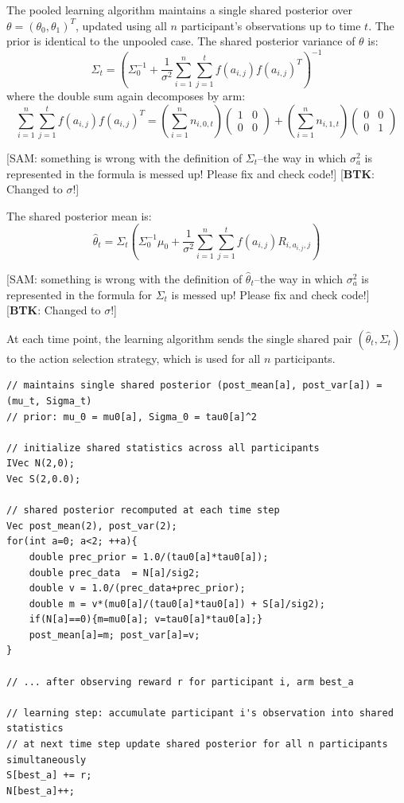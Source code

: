 \documentclass[letterpaper, 9pt]{extarticle}
\newcommand{\sam}[1]{
  {\color{blue} [SAM: {#1}]}
 }
\newcommand{\btk}[1]{%
  {\color{red} [\textbf{BTK}: {#1}]}%
}
\begin{document}
The pooled learning algorithm maintains a single shared posterior over $\theta=(\theta_0,\theta_1)^T$, updated using all $n$ participant's observations up to time $t$. The prior is identical to the unpooled case. The shared posterior variance of $\theta$ is:
\[
\Sigma_t = \left(\Sigma_0^{-1} + \frac{1}{\sigma^2} \sum_{i=1}^n \sum_{j=1}^t f(a_{i,j})f(a_{i,j})^T \right)^{-1}
\]
where the double sum again decomposes by arm:
\[
\sum_{i=1}^n \sum_{j=1}^t f(a_{i,j})f(a_{i,j})^T = \left(\sum_{i=1}^n n_{i,0,t} \right) \begin{pmatrix}
    1 & 0 \\ 0 & 0
\end{pmatrix} + \left(\sum_{i=1}^n n_{i,1,t} \right) \begin{pmatrix}
    0 & 0 \\ 0 & 1
\end{pmatrix}
\]
\sam{something is wrong with the definition of $\Sigma_{t}$--the way in which $\sigma_a^2$ is represented in the formula is messed up! Please fix and check code!} \btk{Changed to $\sigma$!}
The shared posterior mean is:
\[
\hat{\theta}_t = \Sigma_t \left(\Sigma_0^{-1} \mu_0 + \frac{1}{\sigma^2} \sum_{i=1}^n \sum_{j=1}^t f(a_{i,j})R_{i, a_{i,j},j} \right)
\]
\sam{something is wrong with the definition of $\hat\theta_{t}$--the way in which $\sigma_a^2$ is represented in the formula  for $\Sigma_t$ is messed up! Please fix and check code!} \btk{Changed to $\sigma$!}
At each time point, the learning algorithm sends the single shared pair $(\hat{\theta}_t, \Sigma_t)$ to the action selection strategy, which is used for all $n$ participants. 

\begin{lstlisting}[caption={Pooled TS Learning Algorithm}, label={lst:pool_ts_learnalg}]
// maintains single shared posterior (post_mean[a], post_var[a]) = (mu_t, Sigma_t)
// prior: mu_0 = mu0[a], Sigma_0 = tau0[a]^2

// initialize shared statistics across all participants
IVec N(2,0);
Vec S(2,0.0);

// shared posterior recomputed at each time step
Vec post_mean(2), post_var(2);
for(int a=0; a<2; ++a){
    double prec_prior = 1.0/(tau0[a]*tau0[a]);
    double prec_data  = N[a]/sig2;
    double v = 1.0/(prec_data+prec_prior);
    double m = v*(mu0[a]/(tau0[a]*tau0[a]) + S[a]/sig2);
    if(N[a]==0){m=mu0[a]; v=tau0[a]*tau0[a];}
    post_mean[a]=m; post_var[a]=v;
}

// ... after observing reward r for participant i, arm best_a

// learning step: accumulate participant i's observation into shared statistics
// at next time step update shared posterior for all n participants simultaneously
S[best_a] += r;
N[best_a]++;
\end{lstlisting}
\end{document}
